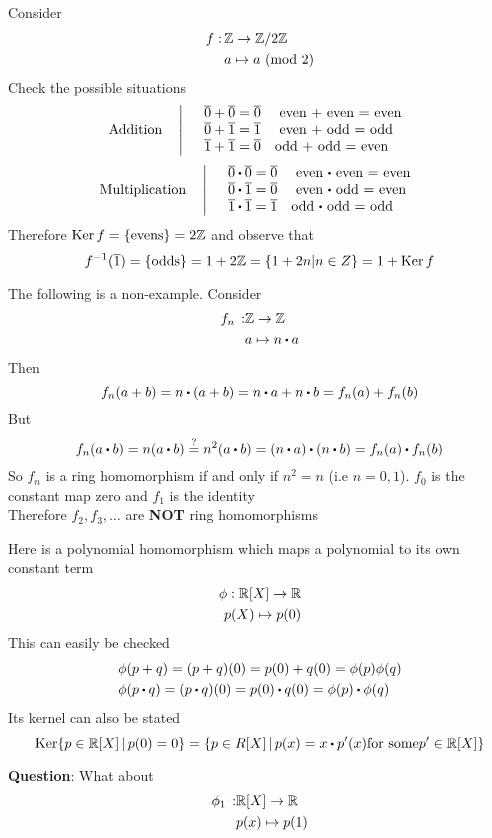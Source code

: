 \documentclass[../Main.tex]{subfiles}
\begin{document}
\begin{example}
	Consider 
	\begin{align*}
		f: \,&\mathbb{Z} \to \mathbb{Z}/2\mathbb{Z}\\
		&a \mapsto a \ (\mathrm{mod}\ 2)
	\end{align*}
	Check the possible situations
	\begin{equation*}
	\text{Addition}  \quad \left|\quad\begin{array}{>$l<$}
	$\obar{0}+ \obar{0} = \obar{0}$ \quad
	even $+ $ even = even\\
	$\obar{0}+ \obar{1}= \obar{1}$ \quad
	even $+ $ odd = odd\\
	$\obar{1}+ \obar{1} = \obar{0}$\quad
	odd $+ $ odd = even
	\end{array}\right.
	\end{equation*}
	\begin{equation*}
	\text{Multiplication} \quad \left|\quad\begin{array}{>$l<$}
	$\obar{0}\rdot \obar{0} = \obar{0}$ \quad
	even $\rdot $ even = even\\
	$\obar{0}\rdot \obar{1}= \obar{0}$ \quad
	even $\rdot $ odd = even\\
	$\obar{1}\rdot \obar{1} = \obar{1}$\quad
	odd $\rdot $ odd = odd
	\end{array}\right.
	\end{equation*}
	Therefore $\operatorname{Ker} f = \{\text{evens}\} = 2\mathbb{Z}$ and observe that
	\[f^{-1}(\overline{1}) = \{ \text{odds}\} = 1+2\mathbb{Z} = \{1+2n | n\in Z\} = 1+\operatorname{Ker} f\]
\end{example}
\begin{example}
	The following is a non-example. Consider
	\begin{align*}
		f_n \,:& \Z \to \Z \\
		&a \mapsto n\rdot a
	\end{align*}
	Then
	\[f_n(a+b)=n\rdot (a+b)=n\rdot a+n\rdot b= f_n(a)+f_n(b)\]
	But 
	\[f_n(a\rdot b)=n(a\rdot b) \stackrel{?}{=} n^2(a\rdot b)=(n\rdot a)\rdot (n\rdot b)=f_n(a)\rdot f_n(b)\]
	So $f_n$ is a ring homomorphism if and only if $n^2=n$ (i.e $n=0,1$). $f_0$ is the constant map zero and $f_1$ is the identity\\
	Therefore $f_2,f_3,\dots $ are \textbf{NOT} ring homomorphisms
\end{example}
\begin{example}
	Here is a polynomial homomorphism which maps a polynomial to its own constant term
	\begin{align*}
		\phi: \mathbb{R}[X] \to \mathbb{R} \\
		p(X) \mapsto p(0)
	\end{align*}
	This can easily be checked
	\begin{align*}
		&\phi(p+q) = (p+q)(0)=p(0)+q(0)=\phi(p)\phi(q)\\
		&\phi(p\rdot q)=(p\rdot q)(0)=p(0)\rdot q(0)=\phi(p)\rdot \phi(q)\\
	\end{align*}
	Its kernel can also be stated
	\[\Ker \{p\in \R[X]\,|\,p(0)=0\} = \{p\in R[X]\,|\,p(x) = x\rdot p'(x) \text{for some} p'\in \R[X]\}\]
\end{example}
\textbf{Question}: What about
\begin{align*}
	\phi_1 \,: &\mathbb{R}[X] \to \mathbb{R}\\
	&p(x) \mapsto p(1)
\end{align*}
\end{document}
